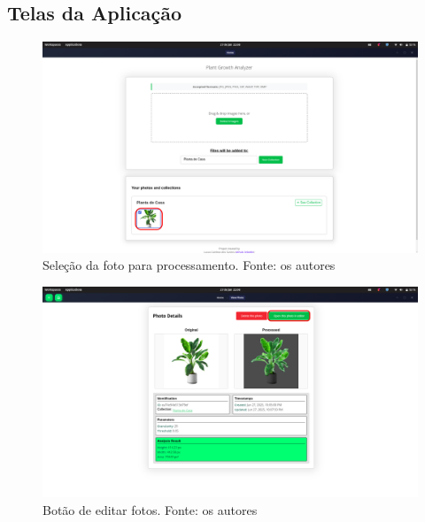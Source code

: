 \subsection{Telas da Aplicação}

\begin{figure}[H]
    \centering
    \includegraphics[width=1\textwidth]{../figures/screens/uc011/Screenshot from 2025-06-27 22-08-11.png}
    \caption{Seleção da foto para processamento. Fonte: os autores}
    \label{fig:uc011-screen1}
\end{figure}

\begin{figure}[H]
    \centering
    \includegraphics[width=1\textwidth]{../figures/screens/uc011/Screenshot from 2025-06-27 22-08-15.png}
    \caption{Botão de editar fotos. Fonte: os autores}
    \label{fig:uc011-screen2}
\end{figure}

